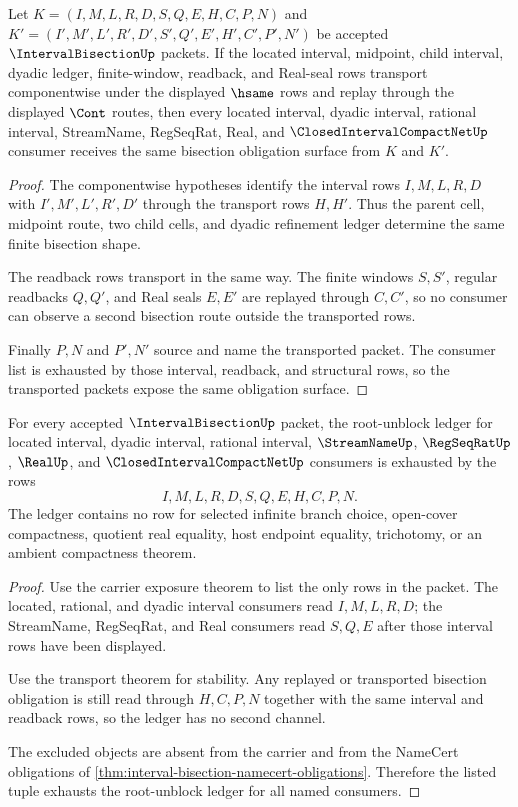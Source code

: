 \begin{theorem}
\label{thm:interval-bisection-obligation-transport}
Let $K=(I,M,L,R,D,S,Q,E,H,C,P,N)$ and $K'=(I',M',L',R',D',S',Q',E',H',C',P',N')$ be accepted $\IntervalBisectionUp$ packets. If the located interval, midpoint, child interval, dyadic ledger, finite-window, readback, and Real-seal rows transport componentwise under the displayed $\hsame$ rows and replay through the displayed $\Cont$ routes, then every located interval, dyadic interval, rational interval, StreamName, RegSeqRat, Real, and $\ClosedIntervalCompactNetUp$ consumer receives the same bisection obligation surface from $K$ and $K'$.
\end{theorem}
\begin{proof}
The componentwise hypotheses identify the interval rows $I,M,L,R,D$ with $I',M',L',R',D'$ through the transport rows $H,H'$. Thus the parent cell, midpoint route, two child cells, and dyadic refinement ledger determine the same finite bisection shape.

The readback rows transport in the same way. The finite windows $S,S'$, regular readbacks $Q,Q'$, and Real seals $E,E'$ are replayed through $C,C'$, so no consumer can observe a second bisection route outside the transported rows.

Finally $P,N$ and $P',N'$ source and name the transported packet. The consumer list is exhausted by those interval, readback, and structural rows, so the transported packets expose the same obligation surface.
\end{proof}

\begin{theorem}
\label{thm:interval-bisection-obligation-ledger}
For every accepted $\IntervalBisectionUp$ packet, the root-unblock ledger for located interval, dyadic interval, rational interval, $\StreamNameUp$, $\RegSeqRatUp$, $\RealUp$, and $\ClosedIntervalCompactNetUp$ consumers is exhausted by the rows
$$
I,M,L,R,D,S,Q,E,H,C,P,N.
$$
The ledger contains no row for selected infinite branch choice, open-cover compactness, quotient real equality, host endpoint equality, trichotomy, or an ambient compactness theorem.
\end{theorem}
\begin{proof}
Use the carrier exposure theorem to list the only rows in the packet. The located, rational, and dyadic interval consumers read $I,M,L,R,D$; the StreamName, RegSeqRat, and Real consumers read $S,Q,E$ after those interval rows have been displayed.

Use the transport theorem for stability. Any replayed or transported bisection obligation is still read through $H,C,P,N$ together with the same interval and readback rows, so the ledger has no second channel.

The excluded objects are absent from the carrier and from the NameCert obligations of \autoref{thm:interval-bisection-namecert-obligations}. Therefore the listed tuple exhausts the root-unblock ledger for all named consumers.
\end{proof}

